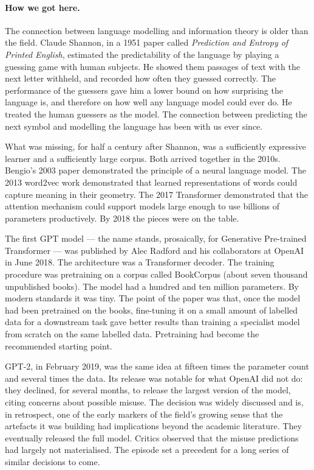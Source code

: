 \paragraph{How we got here.} The connection between language modelling and information
theory is older than the field. Claude Shannon, in a 1951
paper called \emph{Prediction and Entropy of Printed English},
estimated the predictability of the language by playing a
guessing game with human subjects. He showed them passages of
text with the next letter withheld, and recorded how often they
guessed correctly. The performance of the guessers gave him a
lower bound on how surprising the language is, and therefore on
how well any language model could ever do. He treated the human
guessers as the model. The connection between predicting the
next symbol and modelling the language has been with us ever
since.

What was missing, for half a century after Shannon, was a
sufficiently expressive learner and a sufficiently large
corpus. Both arrived together in the 2010s. Bengio's 2003 paper
demonstrated the principle of a neural language model. The
2013 word2vec work demonstrated that learned representations
of words could capture meaning in their geometry. The 2017
Transformer demonstrated that the attention mechanism could
support models large enough to use billions of parameters
productively. By 2018 the pieces were on the table.

The first GPT model --- the name stands, prosaically, for
Generative Pre-trained Transformer --- was published by Alec
Radford and his collaborators at OpenAI in June 2018. The
architecture was a Transformer decoder. The training procedure
was pretraining on a corpus called BookCorpus (about seven
thousand unpublished books). The model had a hundred and ten
million parameters. By modern standards it was tiny. The point
of the paper was that, once the model had been pretrained on
the books, fine-tuning it on a small amount of labelled data
for a downstream task gave better results than training a
specialist model from scratch on the same labelled data.
Pretraining had become the recommended starting point.

GPT-2, in February 2019, was the same idea at fifteen times the
parameter count and several times the data. Its release was
notable for what OpenAI did not do: they declined, for several
months, to release the largest version of the model, citing
concerns about possible misuse. The decision was widely
discussed and is, in retrospect, one of the early markers of the
field's growing sense that the artefacts it was building had
implications beyond the academic literature. They eventually
released the full model. Critics observed that the misuse
predictions had largely not materialised. The episode set a
precedent for a long series of similar decisions to come.

